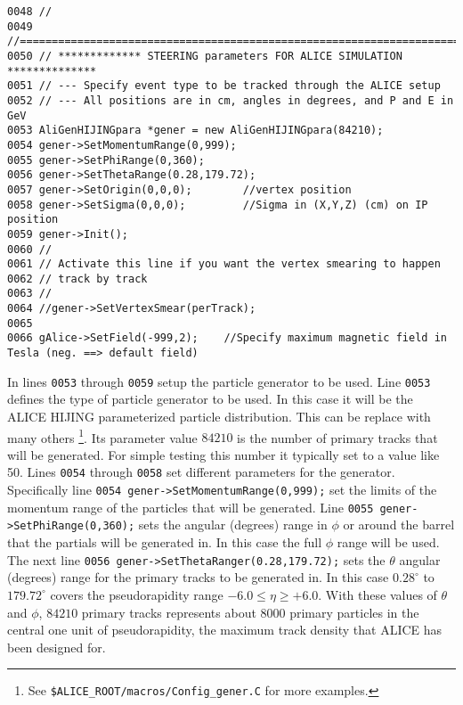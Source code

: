 \scriptsize
\begin{verbatim}
0048 //
0049 //=======================================================================
0050 // ************* STEERING parameters FOR ALICE SIMULATION **************
0051 // --- Specify event type to be tracked through the ALICE setup
0052 // --- All positions are in cm, angles in degrees, and P and E in GeV
0053 AliGenHIJINGpara *gener = new AliGenHIJINGpara(84210);
0054 gener->SetMomentumRange(0,999);
0055 gener->SetPhiRange(0,360);
0056 gener->SetThetaRange(0.28,179.72);
0057 gener->SetOrigin(0,0,0);        //vertex position
0058 gener->SetSigma(0,0,0);         //Sigma in (X,Y,Z) (cm) on IP position
0059 gener->Init();
0060 // 
0061 // Activate this line if you want the vertex smearing to happen
0062 // track by track
0063 //
0064 //gener->SetVertexSmear(perTrack); 
0065 
0066 gAlice->SetField(-999,2);    //Specify maximum magnetic field in Tesla (neg. ==> default field)
\end{verbatim}
\normalsize

In lines \texttt{0053} through \texttt{0059} setup the particle generator to be
used. Line \texttt{0053} defines the type of particle generator to be used. In
this case it will be the ALICE HIJING parameterized particle distribution. 
This can be replace with many others
\footnote{See \texttt{\$ALICE\_ROOT/macros/Config\_gener.C} for more
examples.}. Its parameter value $84210$ is the number of primary tracks that
will be generated. For simple testing this number it typically set to a value
like 50. Lines \texttt{0054} through \texttt{0058} set different parameters for
the generator. Specifically line \texttt{0054 gener->SetMomentumRange(0,999);}
set the limits of the momentum range of the particles that will be
generated. Line \texttt{0055 gener->SetPhiRange(0,360);} sets the angular
(degrees) range in $\phi$ or around the barrel that the partials will be
generated in. In this case the full $\phi$ range will be used. The next line
\texttt{0056 gener->SetThetaRanger(0.28,179.72);} sets the $\theta$ angular
(degrees) range for the primary tracks to be generated in. In this case
$0.28^{\circ}$ to $179.72^{\circ}$ covers the pseudorapidity range $-6.0\leq
\eta \geq +6.0$. With these values of $\theta$ and $\phi$, $84210$ primary
tracks represents about $8000$ primary particles in the central one unit of
pseudorapidity, the maximum track density that ALICE has been designed for.

